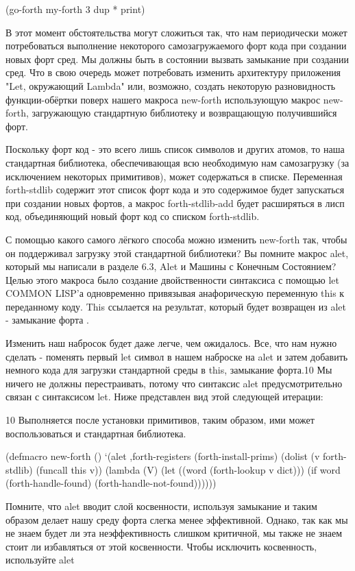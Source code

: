 (go-forth my-forth
3 dup * print)

В этот момент обстоятельства могут сложиться так, что нам периодически может потребоваться выполнение некоторого самозагружаемого форт кода при создании новых форт сред. Мы должны быть в состоянии вызвать замыкание при создании сред. Что в свою очередь может потребовать изменить архитектуру приложения "Let, окружающий Lambda" или, возможно, создать некоторую разновидность функции-обёртки поверх нашего макроса new-forth использующую макрос new-forth, загружающую стандартную библиотеку и возвращающую получившийся форт.

Поскольку форт код - это всего лишь список символов и других атомов, то наша стандартная библиотека, обеспечивающая всю необходимую нам самозагрузку (за исключением некоторых примитивов), может содержаться в списке. Переменная forth-stdlib содержит этот список форт кода и это содержимое будет запускаться при создании новых фортов, а макрос forth-stdlib-add будет расширяться в лисп код, объединяющий новый форт код со списком forth-stdlib.

С помощью какого самого лёгкого способа можно изменить new-forth так, чтобы он поддерживал загрузку этой стандартной библиотеки? Вы помните макрос alet, который мы написали в разделе 6.3, Alet и Машины с Конечным Состоянием? Целью этого макроса было создание двойственности синтаксиса с помощью let COMMON LISP'а одновременно привязывая анафорическую переменную this к переданному коду. This ссылается на результат, который будет возвращен из alet - замыкание форта .

Изменить наш набросок будет даже легче, чем ожидалось. Все, что нам нужно сделать - поменять первый let символ в нашем наброске на alet и затем добавить немного кода для загрузки стандартной среды в this, замыкание форта.10 Мы ничего не должны перестраивать, потому что синтаксис alet предусмотрительно связан с синтаксисом let. Ниже представлен вид этой следующей итерации:

10 Выполняется после установки примитивов, таким образом, ими может воспользоваться и стандартная библиотека.

(defmacro new-forth ()
‘(alet ,forth-registers
(forth-install-prims)
(dolist (v forth-stdlib)
(funcall this v))
(lambda (V)
(let ((word (forth-lookup v dict)))
(if word
(forth-handle-found)
(forth-handle-not-found))))))

Помните, что alet вводит слой косвенности, используя замыкание и таким образом делает нашу среду форта слегка менее эффективной. Однако, так как мы не знаем будет ли эта неэффективность слишком критичной, мы также не знаем стоит ли избавляться от этой косвенности. Чтобы исключить косвенность, используйте alet%

